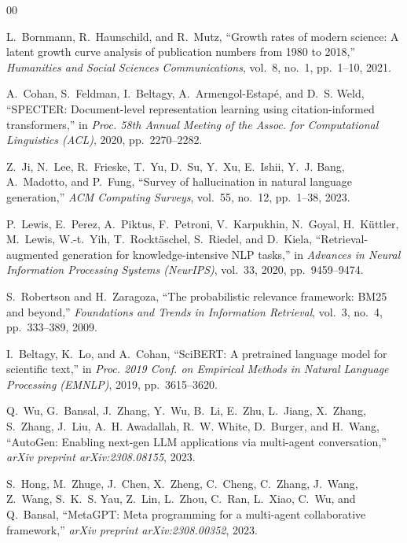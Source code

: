 \documentclass[conference]{IEEEtran}
\begin{document}
\begin{thebibliography}{00}

L.~Bornmann, R.~Haunschild, and R.~Mutz, ``Growth rates of modern science: A latent growth curve analysis of publication numbers from 1980 to 2018,'' \textit{Humanities and Social Sciences Communications}, vol.~8, no.~1, pp.~1--10, 2021.

A.~Cohan, S.~Feldman, I.~Beltagy, A.~Armengol-Estap{\'e}, and D.~S. Weld, ``SPECTER: Document-level representation learning using citation-informed transformers,'' in \textit{Proc. 58th Annual Meeting of the Assoc. for Computational Linguistics (ACL)}, 2020, pp.~2270--2282.

Z.~Ji, N.~Lee, R.~Frieske, T.~Yu, D.~Su, Y.~Xu, E.~Ishii, Y.~J. Bang, A.~Madotto, and P.~Fung, ``Survey of hallucination in natural language generation,'' \textit{ACM Computing Surveys}, vol.~55, no.~12, pp.~1--38, 2023.

P.~Lewis, E.~Perez, A.~Piktus, F.~Petroni, V.~Karpukhin, N.~Goyal, H.~K{\"u}ttler, M.~Lewis, W.-t.~Yih, T.~Rockt{\"a}schel, S.~Riedel, and D.~Kiela, ``Retrieval-augmented generation for knowledge-intensive NLP tasks,'' in \textit{Advances in Neural Information Processing Systems (NeurIPS)}, vol.~33, 2020, pp.~9459--9474.

S.~Robertson and H.~Zaragoza, ``The probabilistic relevance framework: BM25 and beyond,'' \textit{Foundations and Trends in Information Retrieval}, vol.~3, no.~4, pp.~333--389, 2009.

I.~Beltagy, K.~Lo, and A.~Cohan, ``SciBERT: A pretrained language model for scientific text,'' in \textit{Proc. 2019 Conf. on Empirical Methods in Natural Language Processing (EMNLP)}, 2019, pp.~3615--3620.

Q.~Wu, G.~Bansal, J.~Zhang, Y.~Wu, B.~Li, E.~Zhu, L.~Jiang, X.~Zhang, S.~Zhang, J.~Liu, A.~H. Awadallah, R.~W. White, D.~Burger, and H.~Wang, ``AutoGen: Enabling next-gen LLM applications via multi-agent conversation,'' \textit{arXiv preprint arXiv:2308.08155}, 2023.

S.~Hong, M.~Zhuge, J.~Chen, X.~Zheng, C.~Cheng, C.~Zhang, J.~Wang, Z.~Wang, S.~K.~S. Yau, Z.~Lin, L.~Zhou, C.~Ran, L.~Xiao, C.~Wu, and Q.~Bansal, ``MetaGPT: Meta programming for a multi-agent collaborative framework,'' \textit{arXiv preprint arXiv:2308.00352}, 2023.


\end{thebibliography}
\end{document}
